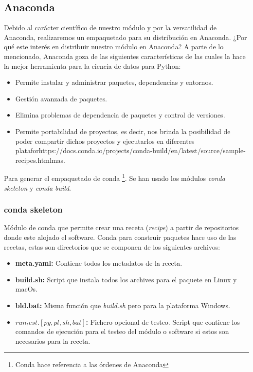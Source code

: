  \subsection*{Anaconda}
 Debido al carácter científico de nuestro módulo y por la versatilidad de Anaconda, realizaremos un empaquetado para su distribución en Anaconda. ¿Por qué este interés en distribuir nuestro módulo en Anaconda? A parte de lo mencionado, Anaconda goza de las siguientes características de las cuales la hace la mejor herramienta para la ciencia de datos para Python:
 \begin{itemize}
     \item Permite instalar y administrar paquetes, dependencias y entornos.
     \item Gestión avanzada de paquetes.
     \item Elimina problemas de dependencia de paquetes y control de versiones.
     \item Permite portabilidad de proyectos, es decir, nos brinda la posibilidad de poder compartir dichos proyectos y ejecutarlos en diferentes plataforhttps://docs.conda.io/projects/conda-build/en/latest/source/sample-recipes.htmlmas.
 \end{itemize}
 
 Para generar el empaquetado de conda \footnote{Conda hace referencia a las órdenes de Anaconda}. Se han usado los módulos \textit{conda skeleton} y \textit{conda build}. \\
 
 \subsubsection*{conda skeleton}
 Módulo de conda que permite crear una receta (\emph{recipe}) a partir de repositorios donde este alojado el software. Conda para construir paquetes hace uso de las recetas, estas son directorios que se componen de los siguientes archivos: 
 
 \begin{itemize}
     \item \textbf{meta.yaml: } Contiene todos los metadatos de la receta.
     \item \textbf{build.sh: } Script que instala todos los archives para el paquete en Linux y macOs.
     \item \textbf{bld.bat: } Misma función que \textit{build.sh} pero para la plataforma Windows.
     \item \textbf{$run_test.[py,pl,sh,bat]$:} Fichero opcional de testeo. Script que contiene los comandos de ejecución para el testeo del módulo o software si estos son necesarios para la receta.
 \end{itemize}
 
